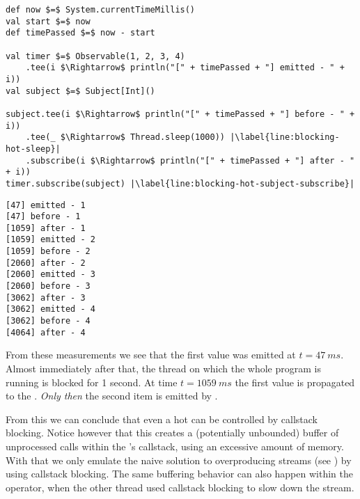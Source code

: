 \hspace*{-\parindent}
\begin{minipage}{\linewidth}
\begin{lstlisting}[style=ScalaStyle, caption={Applying callstack blocking on a hot \obs}, label={lst:blocking-hot-obs}]
def now $=$ System.currentTimeMillis()
val start $=$ now
def timePassed $=$ now - start

val timer $=$ Observable(1, 2, 3, 4)
    .tee(i $\Rightarrow$ println("[" + timePassed + "] emitted - " + i))
val subject $=$ Subject[Int]()

subject.tee(i $\Rightarrow$ println("[" + timePassed + "] before - " + i))
    .tee(_ $\Rightarrow$ Thread.sleep(1000)) |\label{line:blocking-hot-sleep}|
    .subscribe(i $\Rightarrow$ println("[" + timePassed + "] after - " + i))
timer.subscribe(subject) |\label{line:blocking-hot-subject-subscribe}|
\end{lstlisting}
\end{minipage}

\hspace*{-\parindent}
\begin{minipage}{\linewidth}
\begin{lstlisting}[style=ScalaStyle, caption={Console output from \Cref{lst:blocking-hot-obs}}, label={lst:console-output-blocking-hot}]
[47] emitted - 1
[47] before - 1
[1059] after - 1
[1059] emitted - 2
[1059] before - 2
[2060] after - 2
[2060] emitted - 3
[2060] before - 3
[3062] after - 3
[3062] emitted - 4
[3062] before - 4
[4064] after - 4
\end{lstlisting}
\end{minipage}

From these measurements we see that the first value was emitted at $t=47\ ms$. Almost immediately after that, the thread on which the whole program is running is blocked for 1 second. At time $t=1059\ ms$ the first value is propagated to the . \emph{Only then} the second item is emitted by .

From this we can conclude that even a hot \obs can be controlled by callstack blocking. Notice however that this creates a (potentially unbounded) buffer of unprocessed  calls within the 's callstack, using an excessive amount of memory. With that we only emulate the naive solution to overproducing streams (see ) by using callstack blocking. The same buffering behavior can also happen within the  operator, when the other thread used callstack blocking to slow down the stream.


